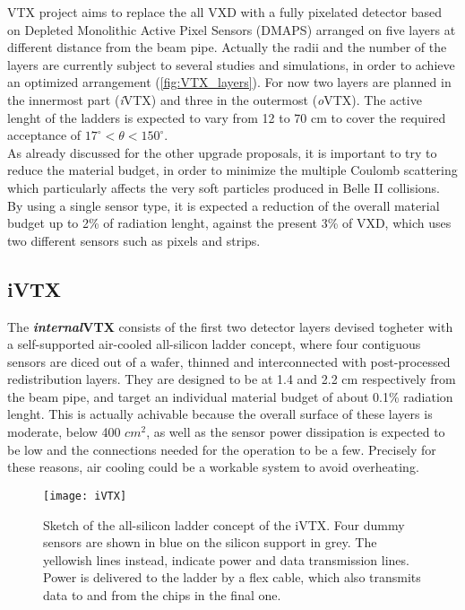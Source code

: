 VTX project aims to replace the all VXD with a fully pixelated detector based on Depleted Monolithic Active Pixel Sensors (DMAPS) arranged on five layers at different distance from the beam pipe. Actually the radii and the number of the layers are currently subject to several  studies and simulations, in order to achieve an optimized arrangement (\autoref{fig:VTX_layers}). 
For now two layers are planned in the innermost part (\textit{i}VTX) and three in the outermost (\textit{o}VTX). The active lenght of the ladders is expected to vary from 12 to 70 cm to cover the required acceptance of $17^{\circ} < \theta < 150^{\circ}$.\\
As already discussed for the other upgrade proposals, it is important to try to reduce the material budget, in order to minimize the multiple Coulomb scattering which particularly affects the very soft particles produced in Belle II collisions. By using a single sensor type, it is expected a reduction of the overall material budget up to 2\% of radiation lenght, against the present 3\% of VXD, which uses two different sensors such as pixels and strips.


\subsection{iVTX}

The \textbf{\textit{internal}VTX} consists of the first two detector layers devised togheter with a self-supported air-cooled all-silicon ladder concept, where four contiguous sensors are diced out of a wafer, thinned and interconnected with post-processed redistribution layers. They are designed to be at 1.4 and 2.2 cm respectively from the beam pipe, and target an individual material budget of about 0.1\% radiation lenght. 
This is actually achivable because the overall surface of these layers is moderate, below 400 $cm^{2}$, as well as the sensor power dissipation is expected to be low and the connections needed for the operation to be a few. Precisely for these reasons, air cooling could be a workable system to avoid overheating.


\begin{figure}[h!]
\centering
\texttt{[image: iVTX]}
\caption{Sketch of the all-silicon ladder concept of the iVTX. Four dummy sensors are shown in blue on the silicon support in grey. The yellowish lines instead, indicate power and data transmission lines. Power is delivered to the ladder by a flex cable, which also transmits data to and from the chips in the final one.}
\label{fig:iVTX}
\end{figure}

